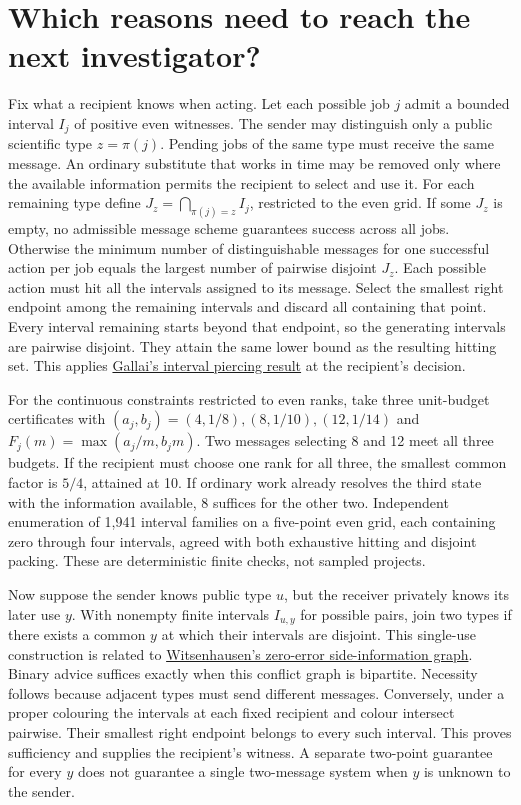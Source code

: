 \documentclass[11pt,a4paper]{article}
\begin{document}
\section{Which reasons need to reach the next investigator?}\label{sec:publicmessages}
Fix what a recipient knows when acting. Let each possible job \(j\) admit a bounded interval \(I_j\) of positive even witnesses. The sender may distinguish only a public scientific type \(z=\pi(j)\). Pending jobs of the same type must receive the same message. An ordinary substitute that works in time may be removed only where the available information permits the recipient to select and use it. For each remaining type define \(J_z=\bigcap_{\pi(j)=z}I_j\), restricted to the even grid. If some \(J_z\) is empty, no admissible message scheme guarantees success across all jobs. Otherwise the minimum number of distinguishable messages for one successful action per job equals the largest number of pairwise disjoint \(J_z\). Each possible action must hit all the intervals assigned to its message. Select the smallest right endpoint among the remaining intervals and discard all containing that point. Every interval remaining starts beyond that endpoint, so the generating intervals are pairwise disjoint. They attain the same lower bound as the resulting hitting set. This applies \href{https://users.renyi.hu/~gyarfas/Cikkek/23_GyarfasLehel_CoveringAndColoringProblemsForRelativesOfIntervals.pdf}{Gallai's interval piercing result} at the recipient's decision.

For the continuous constraints restricted to even ranks, take three unit-budget certificates with \((a_j,b_j)=(4,1/8),(8,1/10),(12,1/14)\) and \(F_j(m)=\max(a_j/m,b_jm)\). Two messages selecting 8 and 12 meet all three budgets. If the recipient must choose one rank for all three, the smallest common factor is \(5/4\), attained at 10. If ordinary work already resolves the third state with the information available, 8 suffices for the other two. Independent enumeration of 1,941 interval families on a five-point even grid, each containing zero through four intervals, agreed with both exhaustive hitting and disjoint packing. These are deterministic finite checks, not sampled projects.

Now suppose the sender knows public type \(u\), but the receiver privately knows its later use \(y\). With nonempty finite intervals \(I_{u,y}\) for possible pairs, join two types if there exists a common \(y\) at which their intervals are disjoint. This single-use construction is related to \href{https://doi.org/10.1109/TIT.1976.1055607}{Witsenhausen's zero-error side-information graph}. Binary advice suffices exactly when this conflict graph is bipartite. Necessity follows because adjacent types must send different messages. Conversely, under a proper colouring the intervals at each fixed recipient and colour intersect pairwise. Their smallest right endpoint belongs to every such interval. This proves sufficiency and supplies the recipient's witness. A separate two-point guarantee for every \(y\) does not guarantee a single two-message system when \(y\) is unknown to the sender.
\end{document}
